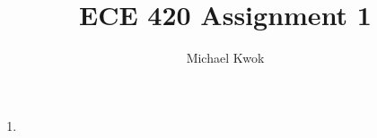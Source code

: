 \documentclass{article}
\title{ECE 420 Assignment 1}
\author{Michael Kwok}
\begin{document}
\maketitle
\begin{enumerate}
    \item
\end{enumerate}
\end{document}
